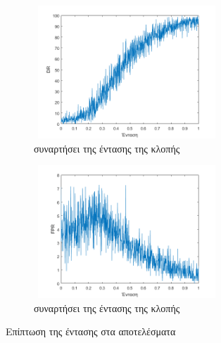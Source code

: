\begin{figure}[ht!]
\centering
\begin{subfigure}[b]{0.4\textwidth}
 \includegraphics[width=70mm, height=50mm]{../../plots/gr_bigres_dr_intensity.png}
\caption{ συναρτήσει της έντασης της κλοπής}
\label{fig:linearDRintensity}
\end{subfigure}
\quad
\begin{subfigure}[b]{0.4\textwidth}
\includegraphics[width=70mm, height=50mm]{../../plots/gr_bigres_fpr_intensity.png}
\caption{ συναρτήσει της έντασης της κλοπής}
\label{fig:linearFPRintensity}
\end{subfigure}
\caption{Επίπτωση της έντασης στα αποτελέσματα}
\label{fig:linearintensityres}
\end{figure}
\newpage
